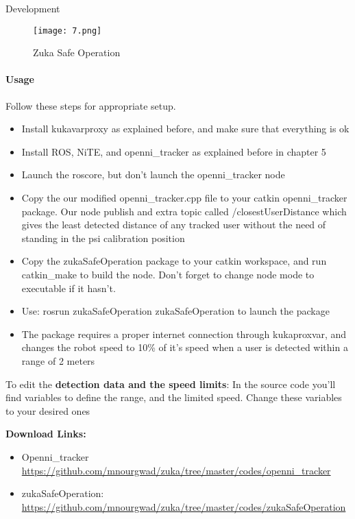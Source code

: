 \documentclass[a4paper]{book}
\begin{document}
\begin{chapter}{Development}
\begin{figure}[H]
	\centering
	\caption{Zuka Safe Operation }
	\texttt{[image: 7.png]}
\end{figure} 
\paragraph{Usage}
Follow these steps for appropriate setup.
\begin{itemize}
	\item Install kukavarproxy as explained before, and make sure that everything is ok
	\item Install ROS, NiTE, and openni\_tracker as explained before in chapter 5
	\item Launch the roscore, but don’t launch the openni\_tracker node
	\item Copy the our modified openni\_tracker.cpp file to your catkin openni\_tracker package. Our node publish and extra topic called /closestUserDistance which gives the least detected distance of any tracked user without the need of standing in the psi calibration position
	\item Copy the zukaSafeOperation package to your catkin workspace, and run catkin\_make to build the node. Don’t forget to change node mode to executable if it hasn’t.
	\item Use: rosrun zukaSafeOperation zukaSafeOperation to launch the package
	\item The package requires a proper internet connection through kukaproxvar, and changes the robot speed to 10\% of it’s speed when a user is detected within a range of 2 meters
	
\end{itemize}

To edit the \textbf{detection data and the speed limits}:
\newline In the source code you’ll find variables to define the range, and the limited speed. Change these variables to your desired ones
\vspace{0.5cm}

\textbf{Download Links:}


\begin{itemize}
	\item Openni\_tracker \newline \url{
		https://github.com/mnourgwad/zuka/tree/master/codes/openni_tracker }
	
	\item	zukaSafeOperation: \newline \url{
		https://github.com/mnourgwad/zuka/tree/master/codes/zukaSafeOperation }
\end{itemize}
 
\end{chapter}
\end{document}
